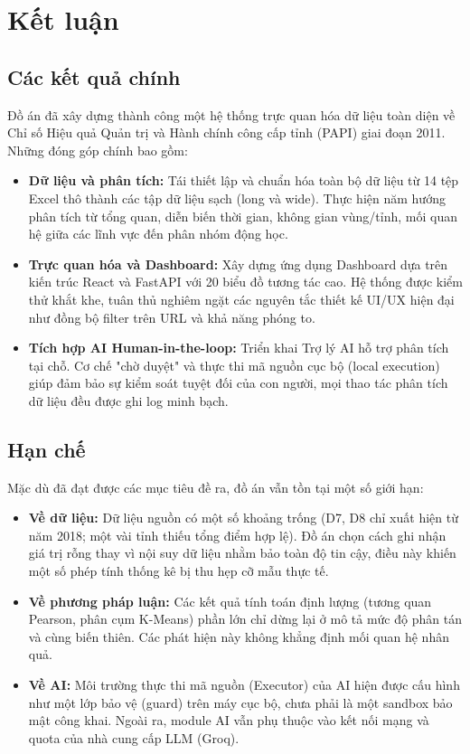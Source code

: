 \section{Kết luận}
\label{sec:conclusion}

\subsection{Các kết quả chính}
Đồ án đã xây dựng thành công một hệ thống trực quan hóa dữ liệu toàn diện về Chỉ số Hiệu quả Quản trị và Hành chính công cấp tỉnh (PAPI) giai đoạn 2011. Những đóng góp chính bao gồm:
\begin{itemize}
    \item \textbf{Dữ liệu và phân tích:} Tái thiết lập và chuẩn hóa toàn bộ dữ liệu từ 14 tệp Excel thô thành các tập dữ liệu sạch (long và wide). Thực hiện năm hướng phân tích từ tổng quan, diễn biến thời gian, không gian vùng/tỉnh, mối quan hệ giữa các lĩnh vực đến phân nhóm động học.
    \item \textbf{Trực quan hóa và Dashboard:} Xây dựng ứng dụng Dashboard dựa trên kiến trúc React và FastAPI với 20 biểu đồ tương tác cao. Hệ thống được kiểm thử khắt khe, tuân thủ nghiêm ngặt các nguyên tắc thiết kế UI/UX hiện đại như đồng bộ filter trên URL và khả năng phóng to.
    \item \textbf{Tích hợp AI Human-in-the-loop:} Triển khai Trợ lý AI hỗ trợ phân tích tại chỗ. Cơ chế "chờ duyệt" và thực thi mã nguồn cục bộ (local execution) giúp đảm bảo sự kiểm soát tuyệt đối của con người, mọi thao tác phân tích dữ liệu đều được ghi log minh bạch.
\end{itemize}

\subsection{Hạn chế}
Mặc dù đã đạt được các mục tiêu đề ra, đồ án vẫn tồn tại một số giới hạn:
\begin{itemize}
    \item \textbf{Về dữ liệu:} Dữ liệu nguồn có một số khoảng trống (D7, D8 chỉ xuất hiện từ năm 2018; một vài tỉnh thiếu tổng điểm hợp lệ). Đồ án chọn cách ghi nhận giá trị rỗng thay vì nội suy dữ liệu nhằm bảo toàn độ tin cậy, điều này khiến một số phép tính thống kê bị thu hẹp cỡ mẫu thực tế.
    \item \textbf{Về phương pháp luận:} Các kết quả tính toán định lượng (tương quan Pearson, phân cụm K-Means) phần lớn chỉ dừng lại ở mô tả mức độ phân tán và cùng biến thiên. Các phát hiện này không khẳng định mối quan hệ nhân quả.
    \item \textbf{Về AI:} Môi trường thực thi mã nguồn (Executor) của AI hiện được cấu hình như một lớp bảo vệ (guard) trên máy cục bộ, chưa phải là một sandbox bảo mật công khai. Ngoài ra, module AI vẫn phụ thuộc vào kết nối mạng và quota của nhà cung cấp LLM (Groq).
\end{itemize}

